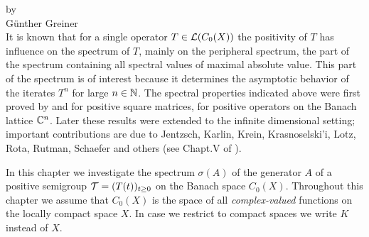 \setcounter{chapter}{2}
\label{chap:b3}%
{\Large
\vspace*{-.75cm}
by \\[.25em]
Günther Greiner
\vspace{.75cm}
\\
}
It is known that for a single operator $T \in \mathcal{L}(C_{0}(X))$ the positivity of $T$ has influence on the spectrum of $T$, mainly on the peripheral spectrum, \ie the part of the spectrum containing all spectral values of maximal absolute value.
This part of the spectrum is of interest because it determines the asymptotic behavior of the iterates $T^{n}$ for large $n \in \mathbb{N}$.
The spectral properties indicated above were first proved by \citet{perron:1907} and \citet{frobenius:1909} for positive square matrices, \ie for positive operators on the Banach lattice $\mathbb{C}^{n}$.
Later these results were extended to the infinite dimensional setting; important contributions are due to Jentzsch, Karlin, Krein, Krasnoselski'i, Lotz, Rota, Rutman, Schaefer and others (see Chapt.V of \citet{schaefer:1974}).

In this chapter we investigate the spectrum $\sigma(A)$ of the generator $A$ of a positive semigroup $\mathcal{T} = (T(t))_{t \geq 0}$ on the Banach space $C_{0}(X)$.
Throughout this chapter we assume that $C_{0}(X)$ is the space of all \emph{complex-valued} functions on the locally compact space $X$.
In case we restrict to compact spaces we write $K$ instead of $X$.
